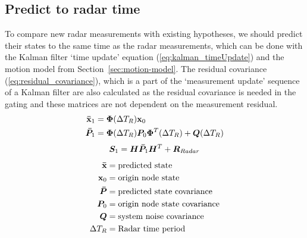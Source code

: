 \subsection{Predict to radar time}
To compare new radar measurements with existing hypotheses, we should predict their states to the same time as the radar measurements, which can be done with the Kalman filter `time update' equation (\ref{eq:kalman_timeUpdate}) and the motion model from Section~\ref{sec:motion-model}. The residual covariance (\ref{eq:residual_covariance}), which is a part of the `measurement update' sequence of a Kalman filter are also calculated as the residual covariance is needed in the gating and these matrices are not dependent on the measurement residual.
\begin{equation}\label{eq:kalman_timeUpdate}
\begin{split}
\boldsymbol{\mathbf{\bar{x}}}_1 	&= \bm{\Phi}(\Delta T_R) \boldsymbol{\mathbf{x}}_0 \\
\bm{\bar{P}}_1	&= \bm{\Phi}(\Delta T_R) \bm{P}_0 \bm{\Phi}^T(\Delta T_R) + \bm{Q}(\Delta T_R) \\
\end{split}
\end{equation}
\begin{equation}\label{eq:residual_covariance}
\bm{S}_1	= \bm{H}\bm{\bar{P}}_1 \bm{H}^T + \bm{R}_{Radar}
\end{equation}
\begin{equation*}
\begin{split}
\boldsymbol{\mathbf{\bar{x}}}		&= \text{predicted state} \\
\boldsymbol{\mathbf{x}}_0 		&= \text{origin node state} \\
\bm{\bar{P}} 	&= \text{predicted state covariance} \\
\bm{P}_0 		&= \text{origin node state covariance} \\
\bm{Q}			&= \text{system noise covariance} \\
\Delta T_R 		&= \text{Radar time period} \\
\end{split}
\end{equation*}

